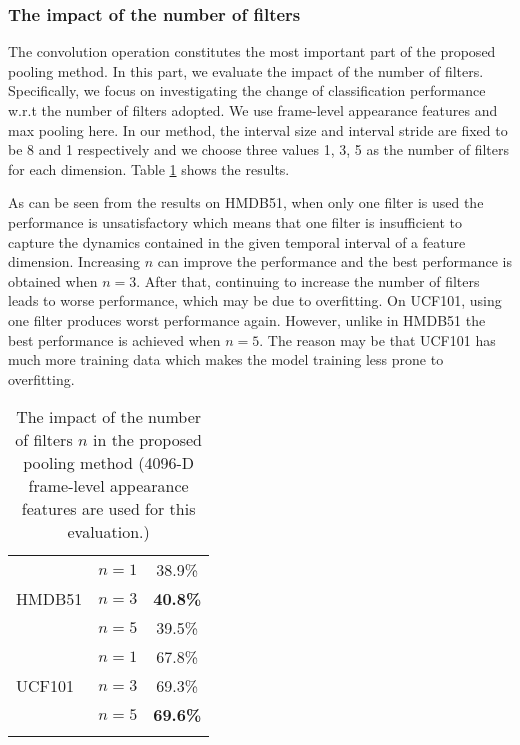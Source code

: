 \documentclass[journal]{IEEEtran}
\begin{document}
\subsubsection{The impact of the number of filters}
The convolution operation constitutes the most important part of the proposed pooling method. In this part, we evaluate the impact of the number of filters. Specifically, we focus on investigating the change of classification performance w.r.t the number of filters adopted. We use frame-level appearance features and max pooling here. In our method, the interval size and interval stride are fixed to be 8 and 1 respectively and we choose three values 1, 3, 5 as the number of filters for each dimension.
Table \ref{tab:cov-neurons} shows the results.

As can be seen from the results on HMDB51, when only one filter is used the performance is unsatisfactory which means that one filter is insufficient to capture the dynamics contained in the given temporal interval of a feature dimension. Increasing $n$ can improve the performance and the best performance is obtained when $n=3$. After that, continuing to increase the number of filters leads to worse performance, which may be due to overfitting. On UCF101, using one filter produces worst performance again. However, unlike in HMDB51 the best performance is achieved when $n=5$. The reason may be that UCF101 has much more training data which makes the model training less prone to overfitting.

\begin{table}[h]\normalsize
 \caption{The impact of the number of filters $n$ in the proposed pooling method (4096-D frame-level appearance features are used for this evaluation.)}
  \centering
  \renewcommand{\arraystretch}{1.2}
    \begin{tabular}{l|cc}
    \hline
    \multirow{3}{*}{HMDB51} & $n=1$ & 38.9\% \\
    & $n=3$ & \textbf{40.8\%} \\
    & $n=5$ & 39.5\% \\
    \hline \hline
	\multirow{3}{*}{ UCF101} & $n=1$ & 67.8\% \\
    & $n=3$ & 69.3\% \\
    & $n=5$ & \textbf{69.6\%} \\
    \hline \noalign{\smallskip}

    \end{tabular}%

  \label{tab:cov-neurons}%
\end{table}%
\end{document}

